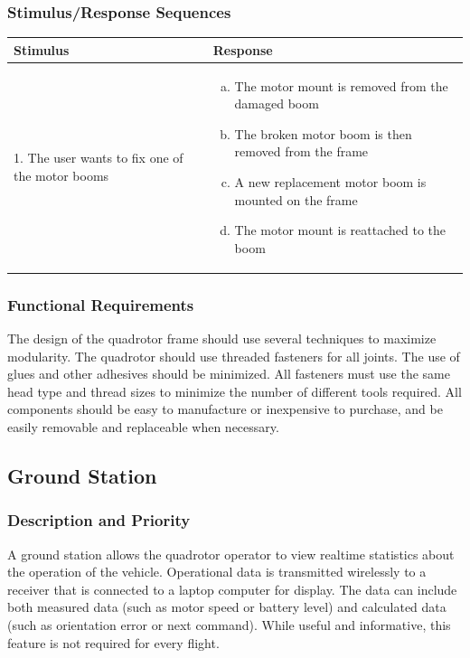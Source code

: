 \documentclass[english]{article}
\numberwithin{equation}{section} %
\begin{document}
\subsubsection{Stimulus/Response Sequences}

\begin{tabular}{p{3cm} | p{8.5cm}}
\hline
\textbf{Stimulus} & \textbf{Response}\\
\hline
1. The user wants to fix one of the motor booms &
\begin{enumerate}[(a)]\itemsep1pt %
\item The motor mount is removed from the damaged boom
\item The broken motor boom is then removed from the frame
\item A new replacement motor boom is mounted on the frame
\item The motor mount is reattached to the boom
\end{enumerate}
\\ 
\hline
\end{tabular}
\subsubsection{Functional Requirements}
The design of the quadrotor frame should use several techniques to maximize modularity. The quadrotor should use threaded fasteners for all joints. The use of glues and other adhesives should be minimized. All fasteners must use the same head type and thread sizes to minimize the number of different tools required. All components should be easy to manufacture or inexpensive to purchase, and be easily removable and replaceable when necessary.

\bigskip
\subsection{Ground Station}
\subsubsection{Description and Priority}
A ground station allows the quadrotor operator to view realtime statistics about the operation of the vehicle. Operational data is transmitted wirelessly to a receiver that is connected to a laptop computer for display. The data can include both measured data (such as motor speed or battery level) and calculated data (such as orientation error or next command). While useful and informative, this feature is not required for every flight.
\end{document}
